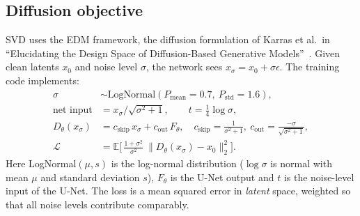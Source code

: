 \documentclass[11pt]{article}
\begin{document}
\subsection{Diffusion objective}
SVD uses the EDM framework, the diffusion formulation of Karras et al.\ in ``Elucidating the Design Space of Diffusion-Based Generative Models''~\cite{karras2022edm}. Given clean latents $x_0$ and noise level $\sigma$, the network sees $x_\sigma = x_0 + \sigma\epsilon$.
The training code implements:
\begin{align}
  \sigma &\sim \text{LogNormal}(P_{\text{mean}}{=}0.7,\ P_{\text{std}}{=}1.6),\\
  \text{net input} &= x_\sigma / \sqrt{\sigma^2+1}, \qquad t = \tfrac14 \log\sigma,\\
  D_\theta(x_\sigma) &= c_{\text{skip}}\,x_\sigma + c_{\text{out}}\,F_\theta, \quad
     c_{\text{skip}}=\tfrac{1}{\sigma^2+1},\ c_{\text{out}}=\tfrac{-\sigma}{\sqrt{\sigma^2+1}},\\
  \mathcal{L} &= \mathbb{E}\Big[\, \tfrac{1+\sigma^2}{\sigma^2}\ \lVert D_\theta(x_\sigma) - x_0 \rVert_2^2 \Big].
\end{align}
Here LogNormal$(\mu,s)$ is the log-normal distribution ($\log\sigma$ is normal with mean $\mu$ and standard deviation $s$), $F_\theta$ is the U-Net output and $t$ is the noise-level input of the U-Net. The loss is a mean squared error in \emph{latent} space, weighted so that all noise levels contribute comparably.
\end{document}
